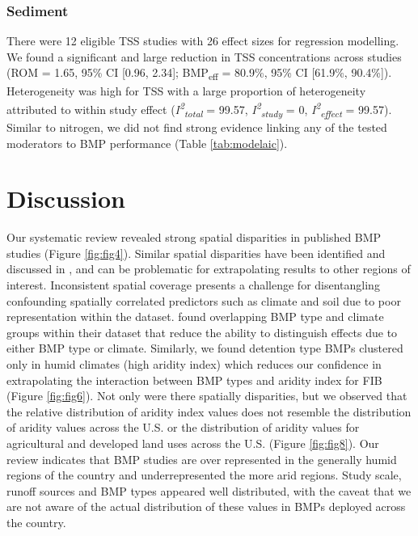 \documentclass[utf8]{FrontiersinHarvard}
\begin{document}
\hypertarget{sediment}{%
\subsubsection{Sediment}\label{sediment}}

There were 12 eligible TSS studies with 26 effect sizes for regression modelling.
We found a significant and large reduction in TSS concentrations across studies (ROM = 1.65, 95\% CI {[}0.96, 2.34{]}; BMP\textsubscript{eff} = 80.9\%, 95\% CI {[}61.9\%, 90.4\%{]}).
Heterogeneity was high for TSS with a large proportion of heterogeneity attributed to within study effect (\textit{I\textsuperscript{2}\textsubscript{total}} = 99.57, \textit{I\textsuperscript{2}\textsubscript{study}} = 0, \textit{I\textsuperscript{2}\textsubscript{effect}} = 99.57).
Similar to nitrogen, we did not find strong evidence linking any of the tested moderators to BMP performance (Table \ref{tab:modelaic}).

\hypertarget{discussion}{%
\section{Discussion}\label{discussion}}

Our systematic review revealed strong spatial disparities in published BMP studies (Figure \ref{fig:fig4}).
Similar spatial disparities have been identified and discussed in \citet{kochNitrogenRemovalStormwater2014}, \citet{grudzinskiDoesRiparianFencing2020} and can be problematic for extrapolating results to other regions of interest.
Inconsistent spatial coverage presents a challenge for disentangling confounding spatially correlated predictors such as climate and soil due to poor representation within the dataset.
\citet{horvathEffectsRegionalClimate2023} found overlapping BMP type and climate groups within their dataset that reduce the ability to distinguish effects due to either BMP type or climate.
Similarly, we found detention type BMPs clustered only in humid climates (high aridity index) which reduces our confidence in extrapolating the interaction between BMP types and aridity index for FIB (Figure \ref{fig:fig6}).
Not only were there spatially disparities, but we observed that the relative distribution of aridity index values does not resemble the distribution of aridity values across the U.S. or the distribution of aridity values for agricultural and developed land uses across the U.S. (Figure \ref{fig:fig8}).
Our review indicates that BMP studies are over represented in the generally humid regions of the country and underrepresented the more arid regions.
Study scale, runoff sources and BMP types appeared well distributed, with the caveat that we are not aware of the actual distribution of these values in BMPs deployed across the country.
\end{document}
